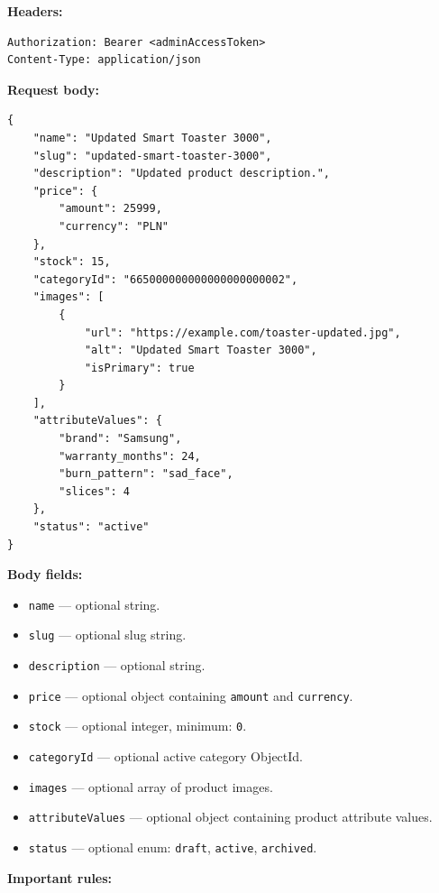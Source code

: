 \textbf{Headers:}

\begin{verbatim}
Authorization: Bearer <adminAccessToken>
Content-Type: application/json
\end{verbatim}

\pagebreak
\textbf{Request body:}

\begin{verbatim}
{
    "name": "Updated Smart Toaster 3000",
    "slug": "updated-smart-toaster-3000",
    "description": "Updated product description.",
    "price": {
        "amount": 25999,
        "currency": "PLN"
    },
    "stock": 15,
    "categoryId": "665000000000000000000002",
    "images": [
        {
            "url": "https://example.com/toaster-updated.jpg",
            "alt": "Updated Smart Toaster 3000",
            "isPrimary": true
        }
    ],
    "attributeValues": {
        "brand": "Samsung",
        "warranty_months": 24,
        "burn_pattern": "sad_face",
        "slices": 4
    },
    "status": "active"
}
\end{verbatim}

\textbf{Body fields:}

\begin{itemize}
    \item \texttt{name} --- optional string.
    \item \texttt{slug} --- optional slug string.
    \item \texttt{description} --- optional string.
    \item \texttt{price} --- optional object containing \texttt{amount} and \texttt{currency}.
    \item \texttt{stock} --- optional integer, minimum: \texttt{0}.
    \item \texttt{categoryId} --- optional active category ObjectId.
    \item \texttt{images} --- optional array of product images.
    \item \texttt{attributeValues} --- optional object containing product attribute values.
    \item \texttt{status} --- optional enum: \texttt{draft}, \texttt{active}, \texttt{archived}.
\end{itemize}

\textbf{Important rules:}


